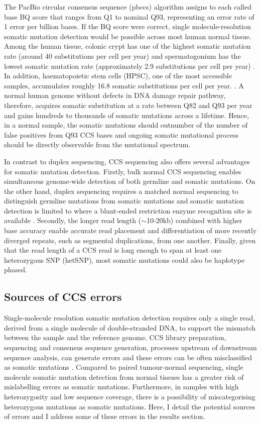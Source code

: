 The PacBio circular consensus sequence (pbccs) algorithm assigns to each called base BQ score that ranges from Q1 to nominal Q93, representing an error rate of 1 error per billion bases. If the BQ score were correct, single molecule-resolution somatic mutation detection would be possible across most human normal tissue. Among the human tissue, colonic crypt has one of the highest somatic mutation rate (around 40 substitutions per cell per year) \cite{Lee-Six2019-vt} and spermatogonium has the lowest somatic mutation rate (approximately 2.9 substitutions per cell per year) \cite{Rahbari2016-ot}. In addition, haematopoietic stem cells (HPSC), one of the most accessible samples, accumulates roughly 16.8 somatic substitutions per cell per year. \cite{Osorio2018-mh, Mitchell2022-ry}. A normal human genome without defects in DNA damage repair pathway, therefore, acquires somatic substitution at a rate between Q82 and Q93 per year and gains hundreds to thousands of somatic mutations across a lifetime. Hence, in a normal sample, the somatic mutations should outnumber of the number of false positives from Q93 CCS bases and ongoing somatic mutational process should be directly observable from the mutational spectrum.  

In contrast to duplex sequencing, CCS sequencing also offers several advantages for somatic mutation detection. Firstly, bulk normal CCS sequencing enables simultaneous genome-wide detection of both germline and somatic mutations. On the other hand, duplex sequencing requires a matched normal sequencing to distinguish germline mutations from somatic mutations and somatic mutation detection is limited to where a blunt-ended restriction enzyme recognition site is available \cite{Abascal2021-pk}. Secondly, the longer read length ($\sim$10-20kb) combined with higher base accuracy enable accurate read placement and differentiation of more recently diverged repeats, such as segmental duplications, from one another. Finally, given that the read length of a CCS read is long enough to span at least one heterozygous SNP (hetSNP), most somatic mutations could also be haplotype phased. 

\subsection{Sources of CCS errors}

Single-molecule resolution somatic mutation detection requires only a single read, derived from a single molecule of double-stranded DNA, to support the mismatch between the sample and the reference genome. CCS library preparation, sequencing and consensus sequence generation, processes upstream of downstream sequence analysis, can generate errors and these errors can be often misclassified as somatic mutations \cite{Saunders2012-we, Cibulskis2013-gw}. Compared to paired tumour-normal sequencing, single molecule somatic mutation detection from normal tissues has a greater risk of mislabelling errors as somatic mutations. Furthermore, in samples with high heterozygosity and low sequence coverage, there is a possibility of miscategorising heterozygous mutations as somatic mutations. Here, I detail the potential sources of errors and I address some of these errors in the results section.

